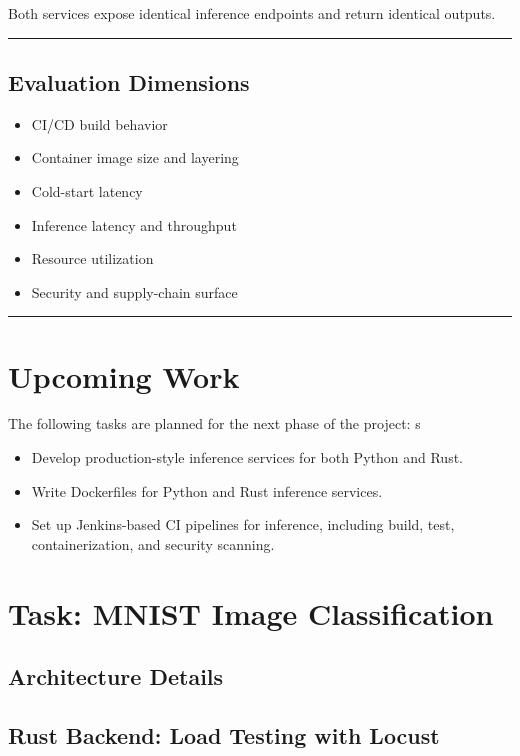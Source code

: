 \documentclass{ieeeaccess}
\begin{document}
Both services expose identical inference endpoints and return identical outputs.

\hrule

\subsection{Evaluation Dimensions}

\begin{itemize}
    \item CI/CD build behavior
    \item Container image size and layering
    \item Cold-start latency
    \item Inference latency and throughput
    \item Resource utilization
    \item Security and supply-chain surface
\end{itemize}

\hrule

\section{Upcoming Work}

The following tasks are planned for the next phase of the project:
s
\begin{itemize}
    \item Develop production-style inference services for both Python and Rust.
    \item Write Dockerfiles for Python and Rust inference services.
    \item Set up Jenkins-based CI pipelines for inference, including build, test, containerization, and security scanning.
\end{itemize}

\section{Task: MNIST Image Classification}
\subsection{Architecture Details}




\subsection{Rust Backend: Load Testing with Locust}
\end{document}

